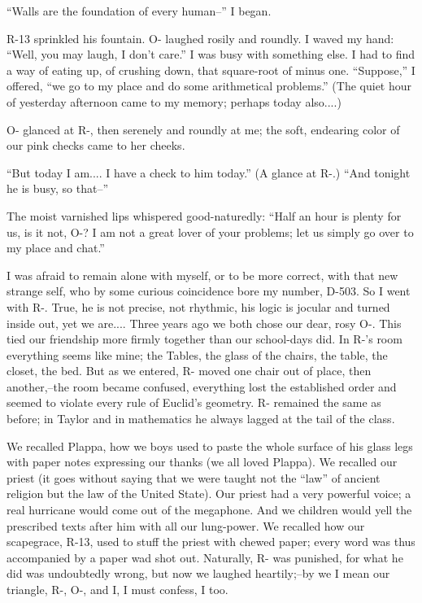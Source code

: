 \documentclass[11pt,openany]{book}
\begin{document}
``Walls are the foundation of every human--'' I began.

R-13 sprinkled his fountain. O- laughed rosily and roundly. I waved my hand: ``Well, you may laugh, I don't care.'' I was busy with something else. I had to find a way of eating up, of crushing down, that square-root of minus one. ``Suppose,'' I offered, ``we go to my place and do some arithmetical problems.'' (The quiet hour of yesterday afternoon came to my memory; perhaps today also....)

O- glanced at R-, then serenely and roundly at me; the soft, endearing color of our pink checks came to her cheeks.

``But today I am.... I have a check to him today.'' (A glance at R-.) ``And tonight he is busy, so that--''

The moist varnished lips whispered good-naturedly: ``Half an hour is plenty for us, is it not, O-? I am not a great lover of your problems; let us simply go over to my place and chat.''

I was afraid to remain alone with myself, or to be more correct, with that new strange self, who by some curious coincidence bore my number, D-503. So I went with R-. True, he is not precise, not rhythmic, his logic is jocular and turned inside out, yet we are.... Three years ago we both chose our dear, rosy O-. This tied our friendship more firmly together than our school-days did. In R-'s room everything seems like mine; the Tables, the glass of the chairs, the table, the closet, the bed. But as we entered, R- moved one chair out of place, then another,--the room became confused, everything lost the established order and seemed to violate every rule of Euclid's geometry. R- remained the same as before; in Taylor and in mathematics he always lagged at the tail of the class.

We recalled Plappa, how we boys used to paste the whole surface of his glass legs with paper notes expressing our thanks (we all loved Plappa). We recalled our priest (it goes without saying that we were taught not the ``law'' of ancient religion but the law of the United State). Our priest had a very powerful voice; a real hurricane would come out of the megaphone. And we children would yell the prescribed texts after him with all our lung-power. We recalled how our scapegrace, R-13, used to stuff the priest with chewed paper; every word was thus accompanied by a paper wad shot out. Naturally, R- was punished, for what he did was undoubtedly wrong, but now we laughed heartily;--by we I mean our triangle, R-, O-, and I, I must confess, I too.
\end{document}
